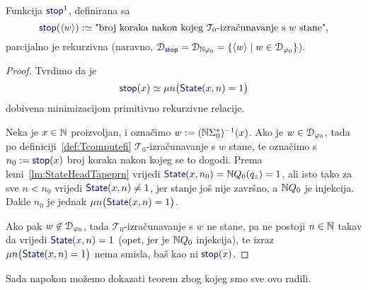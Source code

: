 \begin{lema}[{name=[parcijalna rekurzivnost brojenja koraka do zaustavljanja]}]\label{lm:stopprek}
Funkcija $\f{stop}^1$, definirana sa
\begin{equation}
    \f{stop}(\kr w):\simeq\text{"broj koraka nakon kojeg $\mathcal T_0$-izračunavanje s $w$ stane",}
\end{equation}
    parcijalno je rekurzivna (naravno, $\dom{\f{stop}}=\dom{\N\varphi_0}=\{\kr w\mid w\in\dom{\varphi_0}\}$).
\end{lema}
\begin{proof}
Tvrdimo da je
\begin{equation}\label{eq:stopdef}
    \f{stop}(x)\simeq\mu n\bigl(\f{State}(x,n)=1\bigr)
\end{equation}
dobivena minimizacijom primitivno rekurzivne relacije.

Neka je $x\in{\mathbb N}$ proizvoljan, i označimo $w:=({\mathbb N}\Sigma_0^*)^{-1}(x)$. Ako je $w\in\mathcal D_{\varphi_0}$, tada po definiciji~\ref{def:Tcomputefi} $\mathcal T_0$-izračunavanje s $w$ stane, te označimo s $n_0:=\f{stop}(x)$ broj koraka nakon kojeg se to dogodi.
Prema lemi~\ref{lm:StateHeadTapeprn} vrijedi $\f{State}(x,n_0)=\N Q_0(q_z)=1$, ali isto tako za sve $n<n_0$ vrijedi $\f{State}(x,n)\not=1$, jer stanje još nije završno, a ${\mathbb N} Q_0$ je injekcija. Dakle $n_0$ je jednak $\mu n\bigl(\f{State}(x,n)=1\bigr)$.

Ako pak $w\not\in\mathcal D_{\varphi_0}$, tada $\mathcal T_0$-izračunavanje s $w$ ne stane, pa ne postoji $n\in{\mathbb N}$ takav da vrijedi $\f{State}(x,n)=1$ (opet, jer je ${\mathbb N} Q_0$ injekcija), te izraz $\mu n\bigl(\f{State}(x,n)=1\bigr)$ nema smisla, baš kao ni $\f{stop}(x)$.
\end{proof}

Sada napokon možemo dokazati teorem zbog kojeg smo sve ovo radili.

